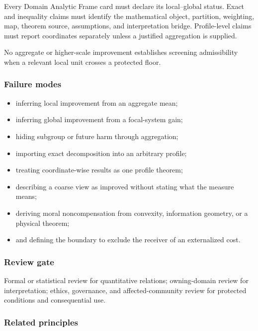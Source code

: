 \documentclass[
  11pt,
]{article}
\providecommand{\tightlist}{%
  \setlength{\itemsep}{0pt}\setlength{\parskip}{0pt}}
\begin{document}
Every Domain Analytic Frame card must declare its local--global status.
Exact and inequality claims must identify the mathematical object,
partition, weighting, map, theorem source, assumptions, and
interpretation bridge. Profile-level claims must report coordinates
separately unless a justified aggregation is supplied.

No aggregate or higher-scale improvement establishes screening
admissibility when a relevant local unit crosses a protected floor.

\subsubsection{Failure modes}\label{failure-modes-12}

\begin{itemize}
\tightlist
\item
  inferring local improvement from an aggregate mean;
\item
  inferring global improvement from a focal-system gain;
\item
  hiding subgroup or future harm through aggregation;
\item
  importing exact decomposition into an arbitrary profile;
\item
  treating coordinate-wise results as one profile theorem;
\item
  describing a coarse view as improved without stating what the measure
  means;
\item
  deriving moral noncompensation from convexity, information geometry,
  or a physical theorem;
\item
  and defining the boundary to exclude the receiver of an externalized
  cost.
\end{itemize}

\subsubsection{Review gate}\label{review-gate-4}

Formal or statistical review for quantitative relations; owning-domain
review for interpretation; ethics, governance, and affected-community
review for protected conditions and consequential use.

\subsubsection{Related principles}\label{related-principles-4}
\end{document}
